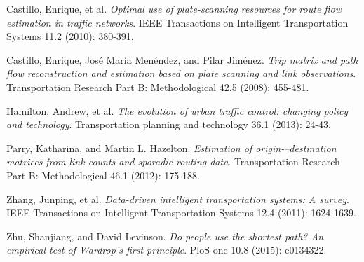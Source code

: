 \documentclass[twoside,leqno,twocolumn]{article}
\begin{document}




\begin{thebibliography}{99}

Castillo, Enrique, et al. {\em Optimal use of plate-scanning resources for route flow estimation in traffic networks}. IEEE Transactions on Intelligent Transportation Systems 11.2 (2010): 380-391.

Castillo, Enrique, José María Menéndez, and Pilar Jiménez. {\em Trip matrix and path flow reconstruction and estimation based on plate scanning and link observations}. Transportation Research Part B: Methodological 42.5 (2008): 455-481.

Hamilton, Andrew, et al. {\em The evolution of urban traffic control: changing policy and technology}. Transportation planning and technology 36.1 (2013): 24-43.

Parry, Katharina, and Martin L. Hazelton. {\em Estimation of origin-–destination matrices from link counts and sporadic routing data}. Transportation Research Part B: Methodological 46.1 (2012): 175-188.

Zhang, Junping, et al. {\em Data-driven intelligent transportation systems: A survey}. IEEE Transactions on Intelligent Transportation Systems 12.4 (2011): 1624-1639.

Zhu, Shanjiang, and David Levinson. {\em Do people use the shortest path? An empirical test of Wardrop’s first principle}. PloS one 10.8 (2015): e0134322.


%

\end{thebibliography}
\end{document}
